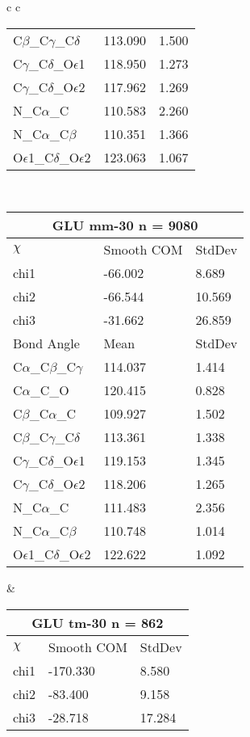 \begin{longtable}{ c c }
\begin{tabular}{ l l l }
  C$\beta$\_C$\gamma$\_C$\delta$ & 113.090 & 1.500\\
  C$\gamma$\_C$\delta$\_O$\epsilon$1 & 118.950 & 1.273\\
  C$\gamma$\_C$\delta$\_O$\epsilon$2 & 117.962 & 1.269\\
  N\_C$\alpha$\_C & 110.583 & 2.260\\
  N\_C$\alpha$\_C$\beta$ & 110.351 & 1.366\\
  O$\epsilon$1\_C$\delta$\_O$\epsilon$2 & 123.063 & 1.067\\
  \bottomrule
  \end{tabular}
  \\
  \begin{tabular}{ l l l }
  \toprule
  \multicolumn{3}{c}{GLU \textbf{mm-30} n = 9080} \\ \toprule
  $\chi$       & Smooth COM & StdDev \\ \midrule
  chi1 & -66.002 & 8.689 \\ 
  chi2 & -66.544 & 10.569 \\ 
  chi3 & -31.662 & 26.859 \\ \midrule
  Bond Angle   & Mean     & StdDev \\ \midrule
  C$\alpha$\_C$\beta$\_C$\gamma$ & 114.037 & 1.414\\
  C$\alpha$\_C\_O & 120.415 & 0.828\\
  C$\beta$\_C$\alpha$\_C & 109.927 & 1.502\\
  C$\beta$\_C$\gamma$\_C$\delta$ & 113.361 & 1.338\\
  C$\gamma$\_C$\delta$\_O$\epsilon$1 & 119.153 & 1.345\\
  C$\gamma$\_C$\delta$\_O$\epsilon$2 & 118.206 & 1.265\\
  N\_C$\alpha$\_C & 111.483 & 2.356\\
  N\_C$\alpha$\_C$\beta$ & 110.748 & 1.014\\
  O$\epsilon$1\_C$\delta$\_O$\epsilon$2 & 122.622 & 1.092\\
  \bottomrule
  \end{tabular}
  &
  \begin{tabular}{ l l l }
  \toprule
  \multicolumn{3}{c}{GLU \textbf{tm-30} n = 862} \\ \toprule
  $\chi$       & Smooth COM & StdDev \\ \midrule
  chi1 & -170.330 & 8.580 \\ 
  chi2 & -83.400 & 9.158 \\ 
  chi3 & -28.718 & 17.284 \\ \midrule

\end{tabular}
\end{longtable}
